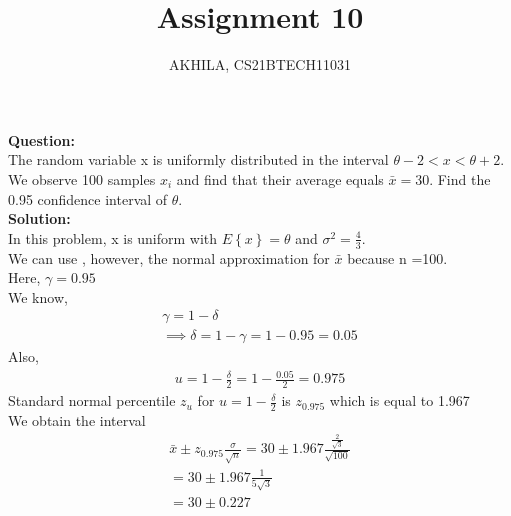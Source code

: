 \documentclass[journal,12pt,twocolumn]{IEEEtran}
\title{Assignment 10}
\author{AKHILA, CS21BTECH11031}
\newcommand{\question}{\noindent \textbf{Question: }}
\newcommand{\solution}{\noindent \textbf{Solution: }}
\providecommand{\cbrak}[1]{\ensuremath{\left\{#1\right\}}}
\begin{document}
\maketitle
\question\\
The random variable x is uniformly distributed in the interval $\theta - 2 < x < \theta + 2$. We 
observe 100 samples $x_i$ and find that their average equals $\bar{x} =30 $. Find the 0.95 confidence 
interval of $\theta$.\\

\solution\\
In this problem, x is uniform with $E\cbrak{x}=\theta$ and $\sigma^2=\frac{4}{3}$.\\
We can use , however, the normal approximation for $\bar{x}$ because n =100.\\

Here, $\gamma=0.95$\\
We know,
\begin{align}
    \gamma = 1- \delta\\
    \implies \delta=1-\gamma = 1-0.95 = 0.05
\end{align}
Also,
    \begin{align}
      u=1-\frac{\delta}{2}=1-\frac{0.05}{2}=0.975    
    \end{align}
Standard normal percentile $z_u$ for $ u=1-\frac{\delta}{2}$ is $z_{0.975}$ which is equal to 1.967\\

We obtain the interval
\begin{align}
    \bar{x} \pm z_{0.975} \frac{\sigma}{\sqrt{n}} = 30 \pm 1.967 \frac{\frac{2}{\sqrt{3}}}{\sqrt{100}}\\
    =30\pm 1.967 \frac{1}{5\sqrt{3}}\\
    = 30\pm 0.227
\end{align}
\end{document}

